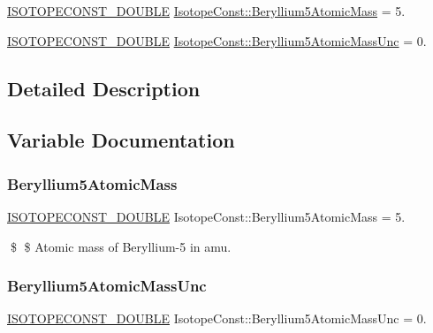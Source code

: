 \begin{DoxyCompactItemize}
\item 
\mbox{\hyperlink{group___isotope_const-_macros_ga8f45a7272ce02c0b4c65c44636ed719a}{I\+S\+O\+T\+O\+P\+E\+C\+O\+N\+S\+T\+\_\+\+D\+O\+U\+B\+LE}} \mbox{\hyperlink{group___isotope_const-_beryllium-_be5_ga98adbebdaf333c9145fa074dc317ab63}{Isotope\+Const\+::\+Beryllium5\+Atomic\+Mass}} = 5.
\item 
\mbox{\hyperlink{group___isotope_const-_macros_ga8f45a7272ce02c0b4c65c44636ed719a}{I\+S\+O\+T\+O\+P\+E\+C\+O\+N\+S\+T\+\_\+\+D\+O\+U\+B\+LE}} \mbox{\hyperlink{group___isotope_const-_beryllium-_be5_gafd0a55d3c6604b0d8dc9461af3d7e825}{Isotope\+Const\+::\+Beryllium5\+Atomic\+Mass\+Unc}} = 0.
\end{DoxyCompactItemize}


\subsection{Detailed Description}


\subsection{Variable Documentation}
\mbox{\label{group___isotope_const-_beryllium-_be5_ga98adbebdaf333c9145fa074dc317ab63}} 
\subsubsection{\texorpdfstring{Beryllium5\+Atomic\+Mass}{Beryllium5AtomicMass}}
{\footnotesize\ttfamily \mbox{\hyperlink{group___isotope_const-_macros_ga8f45a7272ce02c0b4c65c44636ed719a}{I\+S\+O\+T\+O\+P\+E\+C\+O\+N\+S\+T\+\_\+\+D\+O\+U\+B\+LE}} Isotope\+Const\+::\+Beryllium5\+Atomic\+Mass = 5.}

\$ \$ Atomic mass of Beryllium-\/5 in amu. \mbox{\label{group___isotope_const-_beryllium-_be5_gafd0a55d3c6604b0d8dc9461af3d7e825}} 
\subsubsection{\texorpdfstring{Beryllium5\+Atomic\+Mass\+Unc}{Beryllium5AtomicMassUnc}}
{\footnotesize\ttfamily \mbox{\hyperlink{group___isotope_const-_macros_ga8f45a7272ce02c0b4c65c44636ed719a}{I\+S\+O\+T\+O\+P\+E\+C\+O\+N\+S\+T\+\_\+\+D\+O\+U\+B\+LE}} Isotope\+Const\+::\+Beryllium5\+Atomic\+Mass\+Unc = 0.}


